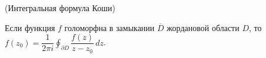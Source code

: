 \begin{comment}
	$\lim\limits_{\epsilon \to 0} \iint_{D_{\epsilon}} \dfrac{\partial f}{\partial \overline{z}} \cdot \dfrac{dx \wedge dy}{z - z_0}$ называется  \textit{главным значением} несобственного интеграла.
\end{comment}

\begin{corollary} (Интегральная формула Коши)
	
	Если функция $f$ голоморфна в замыкании $\overline{D}$ жордановой области $D$, то $f(z_0) = \dfrac{1}{2\pi i} \oint_{\partial D} \dfrac{f(z)}{z - z_0}\, dz$.
\end{corollary}

